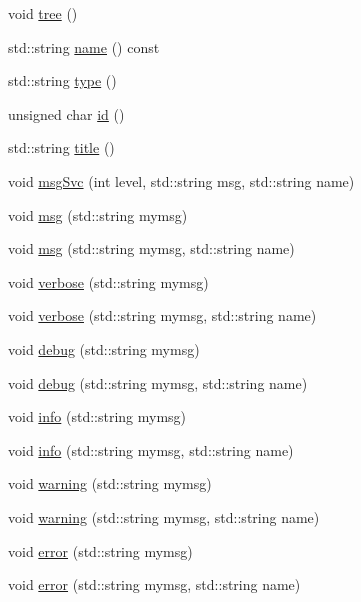 \begin{DoxyCompactItemize}
\item 
void \hyperlink{classHierarchy_a594c294c5f60c230e106d522ed008212}{tree} ()
\item 
std::string \hyperlink{classObject_a975e888d50bfcbffda2c86368332a5cd}{name} () const 
\item 
std::string \hyperlink{classObject_a84f99f70f144a83e1582d1d0f84e4e62}{type} ()
\item 
unsigned char \hyperlink{classObject_af99145335cc61ff6e2798ea17db009d2}{id} ()
\item 
std::string \hyperlink{classObject_a73a0f1a41828fdd8303dd662446fb6c3}{title} ()
\item 
void \hyperlink{classObject_a3f9d5537ebce0c0f2bf6ae4d92426f3c}{msgSvc} (int level, std::string msg, std::string name)
\item 
void \hyperlink{classObject_a58b2d0618c2d08cf2383012611528d97}{msg} (std::string mymsg)
\item 
void \hyperlink{classObject_ac5d59299273cee27aacf7de00d2e7034}{msg} (std::string mymsg, std::string name)
\item 
void \hyperlink{classObject_a83d2db2df682907ea1115ad721c1c4a1}{verbose} (std::string mymsg)
\item 
void \hyperlink{classObject_a2d4120195317e2a3c6532e8bb9f3da68}{verbose} (std::string mymsg, std::string name)
\item 
void \hyperlink{classObject_aac010553f022165573714b7014a15f0d}{debug} (std::string mymsg)
\item 
void \hyperlink{classObject_a6c9a0397ca804e04d675ed05683f5420}{debug} (std::string mymsg, std::string name)
\item 
void \hyperlink{classObject_a644fd329ea4cb85f54fa6846484b84a8}{info} (std::string mymsg)
\item 
void \hyperlink{classObject_a1ca123253dfd30fc28b156f521dcbdae}{info} (std::string mymsg, std::string name)
\item 
void \hyperlink{classObject_a65cd4fda577711660821fd2cd5a3b4c9}{warning} (std::string mymsg)
\item 
void \hyperlink{classObject_a11f101db4dd73d9391b0231818881d86}{warning} (std::string mymsg, std::string name)
\item 
void \hyperlink{classObject_a204a95f57818c0f811933917a30eff45}{error} (std::string mymsg)
\item 
void \hyperlink{classObject_ad7f6c457733082efa2f9ff5f5c8e119a}{error} (std::string mymsg, std::string name)
\item 

\end{DoxyCompactItemize}
